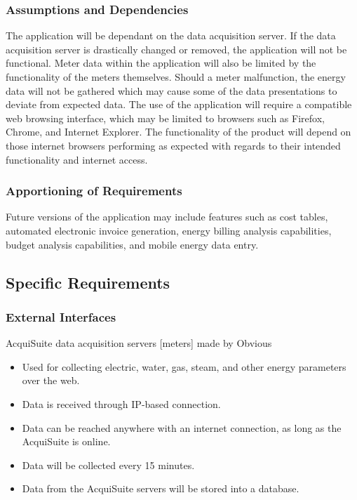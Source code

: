     \subsubsection{Assumptions and Dependencies}
    The application will be dependant on the data acquisition server. If the data acquisition server is drastically changed or removed, the application will not be functional. Meter data within the application will also be limited by the functionality of the meters themselves. Should a meter malfunction, the energy data will not be gathered which may cause some of the data presentations to deviate from expected data. The use of the application will require a compatible web browsing interface, which may be limited to browsers such as Firefox, Chrome, and Internet Explorer. The functionality of the product will depend on those internet browsers performing as expected with regards to their intended functionality and internet access. 

    \subsubsection{Apportioning of Requirements}
    Future versions of the application may include features such as cost tables, automated electronic invoice generation, energy billing analysis capabilities, budget analysis capabilities, and mobile energy data entry.
    
    \subsection{Specific Requirements}
    
    \subsubsection{External Interfaces}
    AcquiSuite data acquisition servers [meters] made by Obvious
    \begin{itemize}
        \setlength\itemsep{1mm}
        \item Used for collecting electric, water, gas, steam, and other energy parameters over the web.
        \item Data is received through IP-based connection.
        \item Data can be reached anywhere with an internet connection, as long as the AcquiSuite is online.
        \item Data will be collected every 15 minutes.
        \item Data from the AcquiSuite servers will be stored into a database.
    \end{itemize}

